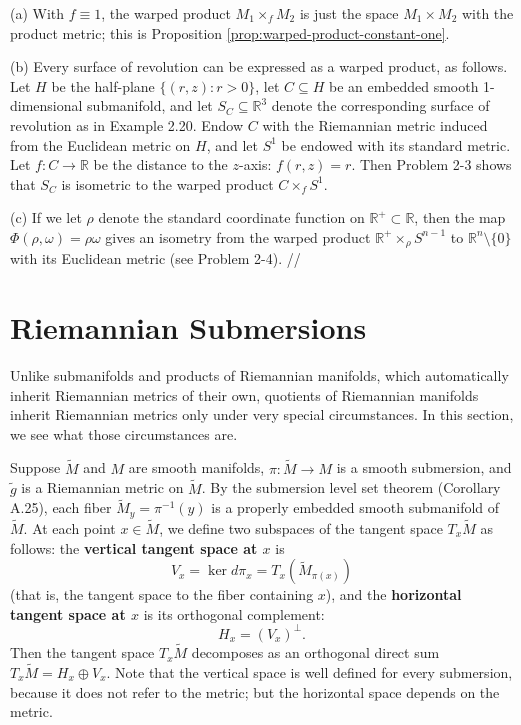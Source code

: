 \begin{example}
\label{ex:warped-products}

\noindent (a) With $f \equiv 1$, the warped product $M_1 \times_f M_2$ is just the space $M_1 \times M_2$ with the product metric; this is Proposition \ref{prop:warped-product-constant-one}.

\noindent (b) Every surface of revolution can be expressed as a warped product, as follows. Let $H$ be the half-plane $\{(r,z) : r > 0\}$, let $C \subseteq H$ be an embedded smooth 1-dimensional submanifold, and let $S_C \subseteq \mathbb{R}^3$ denote the corresponding surface of revolution as in Example 2.20. Endow $C$ with the Riemannian metric induced from the Euclidean metric on $H$, and let $S^1$ be endowed with its standard metric. Let $f : C \to \mathbb{R}$ be the distance to the $z$-axis: $f(r,z) = r$. Then Problem 2-3 shows that $S_C$ is isometric to the warped product $C \times_f S^1$.

(c) If we let $\rho$ denote the standard coordinate function on $\mathbb{R}^+ \subset \mathbb{R}$, then the map $\Phi(\rho,\omega) = \rho\omega$ gives an isometry from the warped product $\mathbb{R}^+ \times_\rho S^{n-1}$ to $\mathbb{R}^n \setminus \{0\}$ with its Euclidean metric (see Problem 2-4). \hfill //
\end{example}

\section{Riemannian Submersions}

Unlike submanifolds and products of Riemannian manifolds, which automatically inherit Riemannian metrics of their own, quotients of Riemannian manifolds inherit Riemannian metrics only under very special circumstances. In this section, we see what those circumstances are.

Suppose $\tilde{M}$ and $M$ are smooth manifolds, $\pi : \tilde{M} \to M$ is a smooth submersion, and $\tilde{g}$ is a Riemannian metric on $\tilde{M}$. By the submersion level set theorem (Corollary A.25), each fiber $\tilde{M}_y = \pi^{-1}(y)$ is a properly embedded smooth submanifold of $\tilde{M}$. At each point $x \in \tilde{M}$, we define two subspaces of the tangent space $T_x \tilde{M}$ as follows: the \textbf{vertical tangent space at $x$} is
\[
V_x = \ker d\pi_x = T_x(\tilde{M}_{\pi(x)})
\]
(that is, the tangent space to the fiber containing $x$), and the \textbf{horizontal tangent space at $x$} is its orthogonal complement:
\[
H_x = (V_x)^\perp.
\]
Then the tangent space $T_x \tilde{M}$ decomposes as an orthogonal direct sum $T_x \tilde{M} = H_x \oplus V_x$. Note that the vertical space is well defined for every submersion, because it does not refer to the metric; but the horizontal space depends on the metric.

